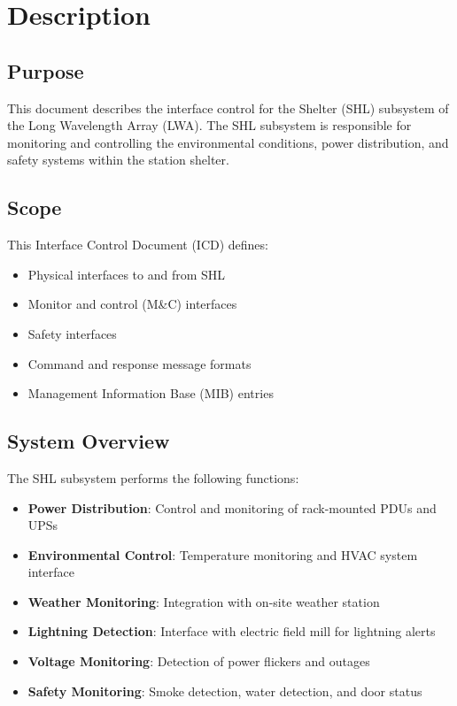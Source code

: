 
\chapter{Description}
\label{sec:description}

\section{Purpose}

This document describes the interface control for the Shelter (SHL) subsystem of the Long Wavelength Array (LWA). The SHL subsystem is responsible for monitoring and controlling the environmental conditions, power distribution, and safety systems within the station shelter.

\section{Scope}

This Interface Control Document (ICD) defines:
\begin{itemize}
    \item Physical interfaces to and from SHL
    \item Monitor and control (M\&C) interfaces
    \item Safety interfaces
    \item Command and response message formats
    \item Management Information Base (MIB) entries
\end{itemize}

\section{System Overview}

The SHL subsystem performs the following functions:
\begin{itemize}
    \item \textbf{Power Distribution}: Control and monitoring of rack-mounted PDUs and UPSs
    \item \textbf{Environmental Control}: Temperature monitoring and HVAC system interface
    \item \textbf{Weather Monitoring}: Integration with on-site weather station
    \item \textbf{Lightning Detection}: Interface with electric field mill for lightning alerts
    \item \textbf{Voltage Monitoring}: Detection of power flickers and outages
    \item \textbf{Safety Monitoring}: Smoke detection, water detection, and door status
\end{itemize}


